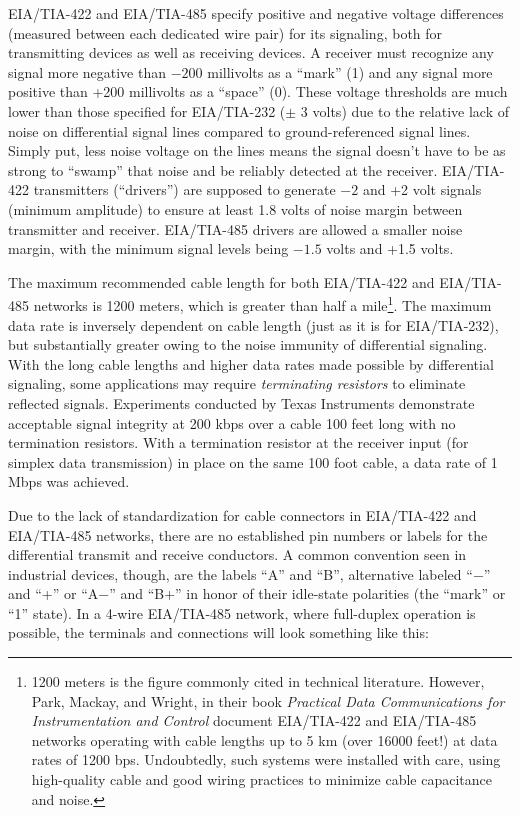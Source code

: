 EIA/TIA-422 and EIA/TIA-485 specify positive and negative voltage differences (measured between each dedicated wire pair) for its signaling, both for transmitting devices as well as receiving devices.  A receiver must recognize any signal more negative than $-200$ millivolts as a ``mark'' (1) and any signal more positive than +200 millivolts as a ``space'' (0).  These voltage thresholds are much lower than those specified for EIA/TIA-232 ($\pm$ 3 volts) due to the relative lack of noise on differential signal lines compared to ground-referenced signal lines.  Simply put, less noise voltage on the lines means the signal doesn't have to be as strong to ``swamp'' that noise and be reliably detected at the receiver.  EIA/TIA-422 transmitters (``drivers'') are supposed to generate $-2$ and +2 volt signals (minimum amplitude) to ensure at least 1.8 volts of noise margin between transmitter and receiver.  EIA/TIA-485 drivers are allowed a smaller noise margin, with the minimum signal levels being $-1.5$ volts and +1.5 volts.  

The maximum recommended cable length for both EIA/TIA-422 and EIA/TIA-485 networks is 1200 meters, which is greater than half a mile\footnote{1200 meters is the figure commonly cited in technical literature.  However, Park, Mackay, and Wright, in their book \textit{Practical Data Communications for Instrumentation and Control} document EIA/TIA-422 and EIA/TIA-485 networks operating with cable lengths up to 5 km (over 16000 feet!) at data rates of 1200 bps.  Undoubtedly, such systems were installed with care, using high-quality cable and good wiring practices to minimize cable capacitance and noise.}.  The maximum data rate is inversely dependent on cable length (just as it is for EIA/TIA-232), but substantially greater owing to the noise immunity of differential signaling.  With the long cable lengths and higher data rates made possible by differential signaling, some applications may require \textit{terminating resistors} to eliminate reflected signals.  Experiments conducted by Texas Instruments demonstrate acceptable signal integrity at 200 kbps over a cable 100 feet long with no termination resistors.  With a termination resistor at the receiver input (for simplex data transmission) in place on the same 100 foot cable, a data rate of 1 Mbps was achieved.

\vskip 10pt

\filbreak

Due to the lack of standardization for cable connectors in EIA/TIA-422 and EIA/TIA-485 networks, there are no established pin numbers or labels for the differential transmit and receive conductors.  A common convention seen in industrial devices, though, are the labels ``A'' and ``B'', alternative labeled ``$-$'' and ``+'' or ``A$-$'' and ``B+'' in honor of their idle-state polarities (the ``mark'' or ``1'' state).  In a 4-wire EIA/TIA-485 network, where full-duplex operation is possible, the terminals and connections will look something like this:

